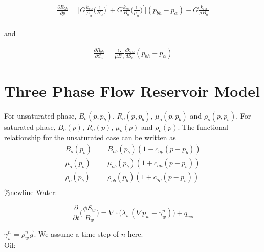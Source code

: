 \documentclass[12pt]{article}
\begin{document}
\begin{equation}
\begin{split}
\frac{\partial R_{bh}}{\partial p} = \Big[G \frac{k_{r\alpha}}{\mu_\alpha}\big( \frac{1}{B_\alpha}\big)^\prime+G \frac{k_{r\alpha}}{B_\alpha}\big( \frac{1}{\mu_\alpha}\big)^\prime\Big](p_{bh}-p_{\alpha})-G \frac{k_{r\alpha}}{\mu B_{\alpha}}\\
\end{split}
\end{equation}

and

\begin{equation}
\begin{split}
\frac{\partial R_{bh}}{\partial S_w} = \frac{G}{\mu B_\alpha} \frac{ dk_{r\alpha}}{dS_w}(p_{bh}-p_{\alpha}) 
\end{split}
\end{equation}





\section{Three Phase Flow Reservoir Model}
For unsaturated phase, $B_o(p,p_b)$, $R_o(p,p_b)$, $\mu_o(p,p_b)$ and  $\rho_o(p,p_b)$. For saturated phase, $B_o(p)$, $R_o(p)$, $\mu_o(p)$ and  $\rho_o(p)$.
The functional relationship for the unsaturated case can be written as
\begin{equation}
\begin{split}
B_o(p_b) &= B_{ob}(p_{b})(1-c_{op}(p-p_b))\\
\mu_o(p_b) &= \mu_{ob}(p_{b})(1+c_{o\mu}(p-p_b))\\
\rho_o(p_b) &= \rho_{ob}(p_{b})(1+c_{o\rho}(p-p_b))\\
\end{split}
\end{equation}
%
\%newline
Water:

\begin{equation}
\frac{\partial}{\partial t}\Big(\frac{\phi S_w}{B_w}\Big) = \nabla\cdot\Big(\lambda_w(\nabla p_w-\gamma_w^n)\Big)+q_{ws}
\end{equation}

$\gamma^n_w = \rho_w^n\vec{g}$. We assume a time step of $n$ here.
\\
Oil:
\end{document}
